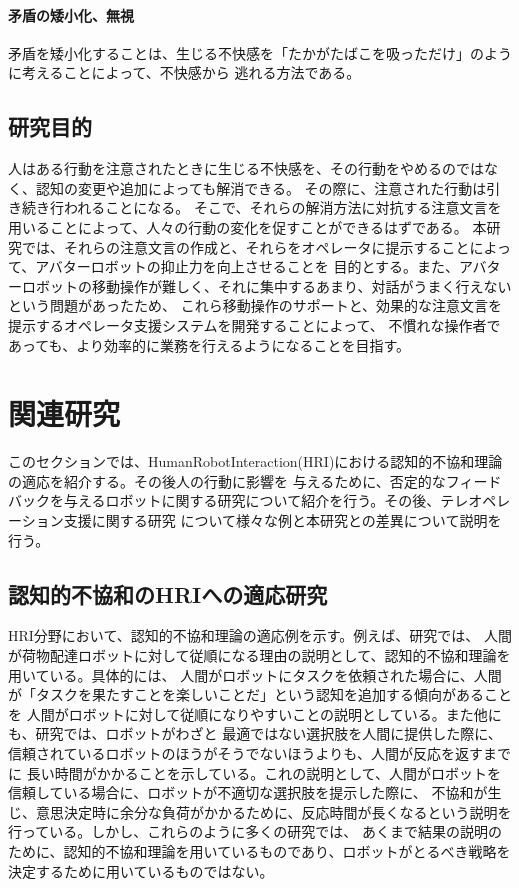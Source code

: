 \documentclass[11pt,a4j]{jreport}
\begin{document}
\subsubsection{矛盾の矮小化、無視}
矛盾を矮小化することは、生じる不快感を「たかがたばこを吸っただけ」のように考えることによって、不快感から
逃れる方法である。

\section{研究目的}
人はある行動を注意されたときに生じる不快感を、その行動をやめるのではなく、認知の変更や追加によっても解消できる。
その際に、注意された行動は引き続き行われることになる。
そこで、それらの解消方法に対抗する注意文言を用いることによって、人々の行動の変化を促すことができるはずである。
本研究では、それらの注意文言の作成と、それらをオペレータに提示することによって、アバターロボットの抑止力を向上させることを
目的とする。また、アバターロボットの移動操作が難しく、それに集中するあまり、対話がうまく行えないという問題があったため、
これら移動操作のサポートと、効果的な注意文言を提示するオペレータ支援システムを開発することによって、
不慣れな操作者であっても、より効率的に業務を行えるようになることを目指す。



\chapter{関連研究}
このセクションでは、HumanRobotInteraction(HRI)における認知的不協和理論の適応を紹介する。その後人の行動に影響を
与えるために、否定的なフィードバックを与えるロボットに関する研究について紹介を行う。その後、テレオペレーション支援に関する研究
について様々な例と本研究との差異について説明を行う。
\section{認知的不協和のHRIへの適応研究}
HRI分野において、認知的不協和理論の適応例を示す。例えば、研究\cite{washburn2022exploring}では、
人間が荷物配達ロボットに対して従順になる理由の説明として、認知的不協和理論を用いている。具体的には、
人間がロボットにタスクを依頼された場合に、人間が「タスクを果たすことを楽しいことだ」という認知を追加する傾向があることを
人間がロボットに対して従順になりやすいことの説明としている。また他にも、研究\cite{herse2018you}では、ロボットがわざと
最適ではない選択肢を人間に提供した際に、信頼されているロボットのほうがそうでないほうよりも、人間が反応を返すまでに
長い時間がかかることを示している。これの説明として、人間がロボットを信頼している場合に、ロボットが不適切な選択肢を提示した際に、
不協和が生じ、意思決定時に余分な負荷がかかるために、反応時間が長くなるという説明を行っている。しかし、これらのように多くの研究では、
あくまで結果の説明のために、認知的不協和理論を用いているものであり、ロボットがとるべき戦略を決定するために用いているものではない。
\end{document}
